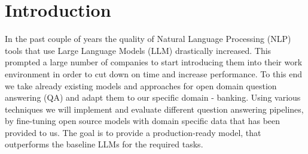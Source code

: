 \documentclass[fleqn,moreauthors,10pt]{ds_report}
\affiliation{\textit{Advisors: prof. dr. Marko Robnik Šikonja, Grega Jerkič, Branislava Šandrih Todorović}}
\begin{document}
\flushbottom

\maketitle
\thispagestyle{empty}


\section*{Introduction}


    In the past couple of years the quality of Natural Language Processing (NLP) tools that use Large Language Models (LLM) drastically increased.
    This prompted a large number of companies to start introducing them into their work environment in order to cut down on time and increase performance.
    To this end we take already existing models and approaches for open domain question answering (QA) and adapt them to our specific domain - banking.
    Using various techniques we will implement and evaluate different question answering pipelines, by fine-tuning open source models with domain specific data that has been provided to us. 
    The goal is to provide a production-ready model, that outperforms the baseline LLMs for the required tasks.
    


\end{document}
